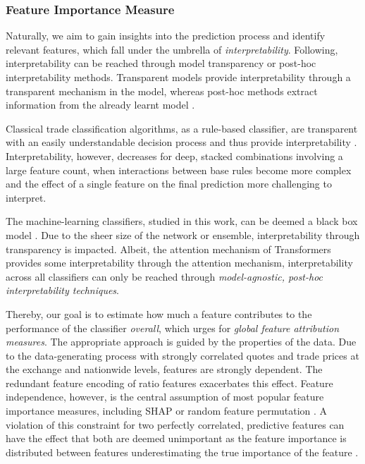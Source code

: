 \subsubsection{Feature Importance
    Measure}\label{sec:feature-importance-measure}

Naturally, we aim to gain insights into the prediction process and identify relevant features, which fall under the umbrella of \emph{interpretability}.
Following, \textcite[][4]{liptonMythosModelInterpretability2017} interpretability can be reached through model transparency or post-hoc interpretability methods. Transparent models provide interpretability through a transparent mechanism in the model, whereas post-hoc methods extract information from the already learnt model \autocite[][4--5]{liptonMythosModelInterpretability2017}.

Classical trade classification algorithms, as a rule-based classifier, are transparent with an easily understandable decision process and thus provide interpretability \autocite[][91]{barredoarrietaExplainableArtificialIntelligence2020}. Interpretability, however, decreases for deep, stacked combinations involving a large feature count, when interactions between base rules become more complex and the effect of a single feature on the final prediction more challenging to interpret.

The machine-learning classifiers, studied in this work, can be deemed a black box model \autocite[][90]{barredoarrietaExplainableArtificialIntelligence2020}. Due to the sheer size of the network or ensemble, interpretability through transparency is impacted. Albeit, the attention mechanism of Transformers provides some interpretability through the attention mechanism,  interpretability across all classifiers can only be reached through \emph{model-agnostic, post-hoc interpretability techniques}.

Thereby, our goal is to estimate how much a feature contributes to the performance of the classifier \emph{overall}, which urges for \emph{global feature attribution measures}. The appropriate approach is guided by the properties of the data. Due to the data-generating process with strongly correlated quotes and trade prices at the exchange and nationwide levels, features are strongly dependent. The redundant feature encoding of ratio features exacerbates this effect. Feature independence, however, is the central assumption of most popular feature importance measures, including \gls{SHAP} or random feature permutation \autocite[][2]{aasExplainingIndividualPredictions2021}. A violation of this constraint for two perfectly correlated, predictive features can have the effect that both are deemed unimportant as the feature importance is distributed between features underestimating the true importance of the feature \autocite[][4]{covertUnderstandingGlobalFeature2020}.

